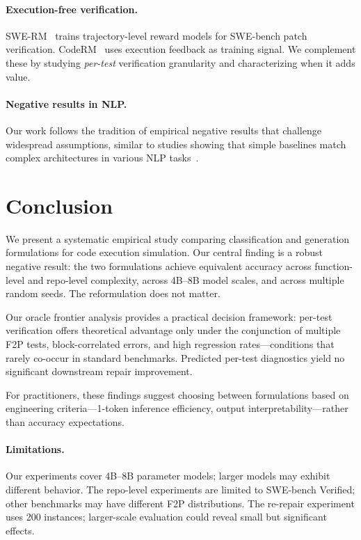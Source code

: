 \documentclass[11pt,a4paper]{article}
\begin{document}
\paragraph{Execution-free verification.}
SWE-RM~\cite{zhang2025swerm} trains trajectory-level reward models for SWE-bench patch verification.
CodeRM~\cite{shi2024coderm} uses execution feedback as training signal.
We complement these by studying \emph{per-test} verification granularity and characterizing when it adds value.

\paragraph{Negative results in NLP.}
Our work follows the tradition of empirical negative results that challenge widespread assumptions, similar to studies showing that simple baselines match complex architectures in various NLP tasks~\cite{lipton2018troubling}.

\section{Conclusion}
\label{sec:conclusion}

We present a systematic empirical study comparing classification and generation formulations for code execution simulation.
Our central finding is a robust negative result: the two formulations achieve equivalent accuracy across function-level and repo-level complexity, across 4B--8B model scales, and across multiple random seeds.
The reformulation does not matter.

Our oracle frontier analysis provides a practical decision framework: per-test verification offers theoretical advantage only under the conjunction of multiple F2P tests, block-correlated errors, and high regression rates---conditions that rarely co-occur in standard benchmarks.
Predicted per-test diagnostics yield no significant downstream repair improvement.

For practitioners, these findings suggest choosing between formulations based on engineering criteria---1-token inference efficiency, output interpretability---rather than accuracy expectations.

\paragraph{Limitations.}
Our experiments cover 4B--8B parameter models; larger models may exhibit different behavior.
The repo-level experiments are limited to SWE-bench Verified; other benchmarks may have different F2P distributions.
The re-repair experiment uses 200 instances; larger-scale evaluation could reveal small but significant effects.
\end{document}
